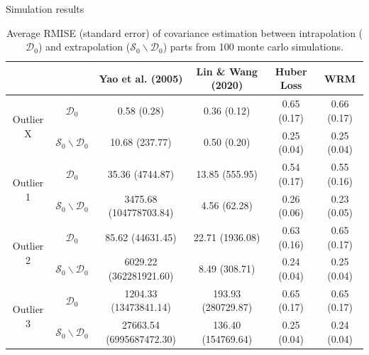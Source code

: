 \documentclass[9pt]{beamer}
\begin{document}
\begin{frame}[allowframebreaks]{Simulation results}
    \pagebreak
	\vspace*{0pt}
	\begin{table}[ht]
		\footnotesize
		\centering
		\tabcolsep=4.5pt
		\begin{tabular}{cccccc}
			\hline\hline
			& & Yao et al. (2005) & Lin \& Wang (2020) & Huber Loss & WRM \\ 
			\hline
			\multirow{2}{*}{Outlier X} & $\mathcal{D}_0$ & 0.58 (0.28) & 0.36 (0.12) & 0.65 (0.17) & 0.66 (0.17) \\ 
									   & $\mathcal{S}_0 \backslash \mathcal{D}_0$ & 10.68 (237.77) & 0.50 (0.20) & 0.25 (0.04) & 0.25 (0.04) \\ 
			\hline
			\multirow{2}{*}{Outlier 1} & $\mathcal{D}_0$ & 35.36 (4744.87) & 13.85 (555.95) & 0.54 (0.17) & 0.55 (0.16) \\  
									   & $\mathcal{S}_0 \backslash \mathcal{D}_0$ & 3475.68 (104778703.84) & 4.56 (62.28) & 0.26 (0.06) & 0.23 (0.05) \\ 
			\hline
			\multirow{2}{*}{Outlier 2} & $\mathcal{D}_0$ & 85.62 (44631.45) & 22.71 (1936.08) & 0.63 (0.16) & 0.65 (0.17) \\ 
									   & $\mathcal{S}_0 \backslash \mathcal{D}_0$ & 6029.22 (362281921.60) & 8.49 (308.71) & 0.24 (0.04) & 0.25 (0.04) \\ 
			\hline
			\multirow{2}{*}{Outlier 3} & $\mathcal{D}_0$ & 1204.33 (13473841.14) & 193.93 (280729.87) & 0.65 (0.17) & 0.65 (0.17) \\ 
									   & $\mathcal{S}_0 \backslash \mathcal{D}_0$ & 27663.54 (6995687472.30) & 136.40 (154769.64) & 0.25 (0.04) & 0.24 (0.04) \\  
			\hline\hline
		\end{tabular}
		\caption{Average RMISE (standard error) of covariance estimation between intrapolation ($\mathcal{D}_0$) and extrapolation ($\mathcal{S}_0 \backslash \mathcal{D}_0$) parts from 100 monte carlo simulations.}\label{t2}
	\end{table}
 

\end{frame}
\end{document}
